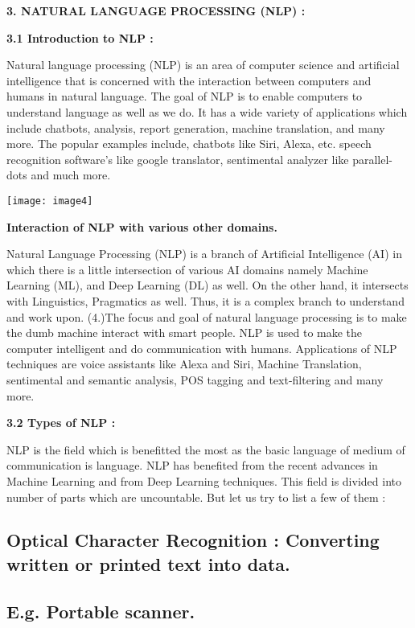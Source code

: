 \documentclass{article} %
\begin{document}
\noindent \textbf{3. NATURAL LANGUAGE PROCESSING (NLP) :}

\textbf{3.1 Introduction to NLP :}

Natural language processing (NLP) is an area of computer science and artificial intelligence that is concerned with the interaction between computers and humans in natural language. The goal of NLP is to enable computers to understand language as well as we do. It has a wide variety of applications which include chatbots, analysis, report generation, machine translation, and many more. The popular examples include, chatbots like Siri, Alexa, etc. speech recognition software's like google translator, sentimental analyzer like parallel-dots and much more. 

\texttt{[image: image4]}\textbf{}

\noindent \textbf{Interaction of NLP with various other domains.}

Natural Language Processing (NLP) is a branch of Artificial Intelligence (AI) in which there is a little intersection of various AI domains namely Machine Learning (ML), and Deep Learning (DL) as well. On the other hand, it intersects with Linguistics, Pragmatics as well. Thus, it is a complex branch to understand and work upon. (4.)The focus and goal of natural language processing is to make the dumb machine interact with smart people. NLP is used to make the computer intelligent and do communication with humans. Applications of NLP techniques are voice assistants like Alexa and Siri, Machine Translation, sentimental and semantic analysis, POS tagging and text-filtering and many more.

\textbf{3.2 Types of NLP :}

\textbf{ }NLP is the field which is benefitted the most as the basic language of medium of communication is language. NLP has benefited from the recent advances in Machine Learning and from Deep Learning techniques. This field is divided into number of parts which are uncountable. But let us try to list a few of them :\textbf{}


\subsection{ Optical Character Recognition : Converting written or printed text into data.}

\noindent 
\subsection{E.g. Portable scanner. }
\end{document}

